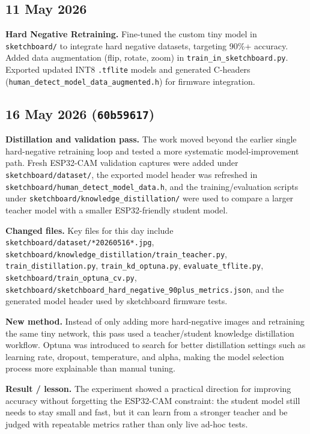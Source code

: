 \documentclass[11pt,a4paper]{article}
\begin{document}
\subsection{11 May 2026}
\textbf{Hard Negative Retraining.} Fine-tuned the custom tiny model in \texttt{sketchboard/} to integrate hard negative datasets, targeting 90\%+ accuracy. Added data augmentation (flip, rotate, zoom) in \texttt{train\_in\_sketchboard.py}. Exported updated INT8 \texttt{.tflite} models and generated C-headers (\texttt{human\_detect\_model\_data\_augmented.h}) for firmware integration.

\subsection{16 May 2026 (\texttt{60b59617})}
\textbf{Distillation and validation pass.} The work moved beyond the earlier single hard-negative retraining loop and tested a more systematic model-improvement path. Fresh ESP32-CAM validation captures were added under \texttt{sketchboard/dataset/}, the exported model header was refreshed in \texttt{sketchboard/human\_detect\_model\_data.h}, and the training/evaluation scripts under \texttt{sketchboard/knowledge\_distillation/} were used to compare a larger teacher model with a smaller ESP32-friendly student model.

\textbf{Changed files.} Key files for this day include \texttt{sketchboard/dataset/*20260516*.jpg}, \texttt{sketchboard/knowledge\_distillation/train\_teacher.py}, \texttt{train\_distillation.py}, \texttt{train\_kd\_optuna.py}, \texttt{evaluate\_tflite.py}, \texttt{sketchboard/train\_optuna\_cv.py}, \texttt{sketchboard/sketchboard\_hard\_negative\_90plus\_metrics.json}, and the generated model header used by sketchboard firmware tests.

\textbf{New method.} Instead of only adding more hard-negative images and retraining the same tiny network, this pass used a teacher/student knowledge distillation workflow. Optuna was introduced to search for better distillation settings such as learning rate, dropout, temperature, and alpha, making the model selection process more explainable than manual tuning.

\textbf{Result / lesson.} The experiment showed a practical direction for improving accuracy without forgetting the ESP32-CAM constraint: the student model still needs to stay small and fast, but it can learn from a stronger teacher and be judged with repeatable metrics rather than only live ad-hoc tests.
\end{document}
